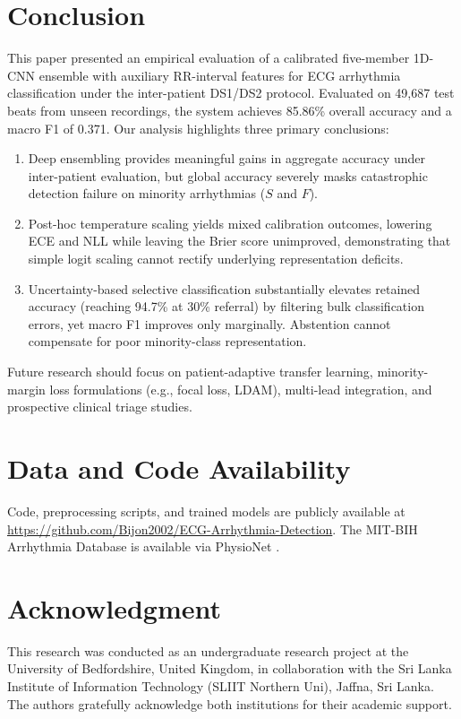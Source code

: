 \documentclass[conference]{IEEEtran}
\begin{document}
\section{Conclusion}

This paper presented an empirical evaluation of a calibrated five-member 1D-CNN ensemble with auxiliary RR-interval features for ECG arrhythmia classification under the inter-patient DS1/DS2 protocol. Evaluated on 49,687 test beats from unseen recordings, the system achieves 85.86\% overall accuracy and a macro F1 of 0.371. Our analysis highlights three primary conclusions:
\begin{enumerate}
    \item Deep ensembling provides meaningful gains in aggregate accuracy under inter-patient evaluation, but global accuracy severely masks catastrophic detection failure on minority arrhythmias ($S$ and $F$).
    \item Post-hoc temperature scaling yields mixed calibration outcomes, lowering ECE and NLL while leaving the Brier score unimproved, demonstrating that simple logit scaling cannot rectify underlying representation deficits.
    \item Uncertainty-based selective classification substantially elevates retained accuracy (reaching 94.7\% at 30\% referral) by filtering bulk classification errors, yet macro F1 improves only marginally. Abstention cannot compensate for poor minority-class representation.
\end{enumerate}

Future research should focus on patient-adaptive transfer learning, minority-margin loss formulations (e.g., focal loss, LDAM), multi-lead integration, and prospective clinical triage studies.

\section*{Data and Code Availability}
Code, preprocessing scripts, and trained models are publicly available at \url{https://github.com/Bijon2002/ECG-Arrhythmia-Detection}. The MIT-BIH Arrhythmia Database is available via PhysioNet \cite{b11}.

\section*{Acknowledgment}
This research was conducted as an undergraduate research project at the University of Bedfordshire, United Kingdom, in collaboration with the Sri Lanka Institute of Information Technology (SLIIT Northern Uni), Jaffna, Sri Lanka. The authors gratefully acknowledge both institutions for their academic support.
\end{document}
